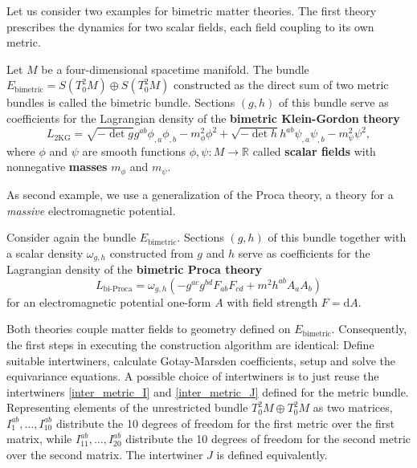 Let us consider two examples for bimetric matter theories. The first theory prescribes the dynamics for two scalar fields, each field coupling to its own metric.
\begin{definition}
  Let $M$ be a four-dimensional spacetime manifold. The bundle $E_\text{bimetric} = S(T^2_0M) \oplus S(T^2_0M)$ constructed as the direct sum of two metric bundles is called the bimetric bundle. Sections $(g,h)$ of this bundle serve as coefficients for the Lagrangian density of the \textbf{bimetric Klein-Gordon theory}
  \begin{equation}
    L_\text{2KG} = \sqrt{-\operatorname{det}g}g^{ab} \phi_{,a}\phi_{,b} - m_\phi^2 \phi^2 + \sqrt{-\operatorname{det}h}h^{ab} \psi_{,a}\psi_{,b} - m_\psi^2 \psi^2,
  \end{equation}
  where $\phi$ and $\psi$ are smooth functions $\phi,\psi\colon M\rightarrow \mathbb R$ called \textbf{scalar fields} with nonnegative \textbf{masses} $m_\phi$ and $m_\psi$.
\end{definition}
As second example, we use a generalization of the Proca theory, a theory for a \emph{massive} electromagnetic potential.
\begin{definition}
  Consider again the bundle $E_\text{bimetric}$. Sections $(g,h)$ of this bundle together with a scalar density $\omega_{g,h}$ constructed from $g$ and $h$ serve as coefficients for the Lagrangian density of the \textbf{bimetric Proca theory}
  \begin{equation}
    L_\text{bi-Proca} = \omega_{g,h}\left( -g^{ac} g^{bd} F_{ab} F_{cd} + m^2 h^{ab} A_a A_b \right)
  \end{equation}
  for an electromagnetic potential one-form $A$ with field strength $F=\mathrm dA$.
\end{definition}

Both theories couple matter fields to geometry defined on $E_\text{bimetric}$. Consequently, the first steps in executing the construction algorithm are identical: Define suitable intertwiners, calculate Gotay-Marsden coefficients, setup and solve the equivariance equations. A possible choice of intertwiners is to just reuse the intertwiners \eqref{inter_metric_I} and \eqref{inter_metric_J} defined for the metric bundle. Representing elements of the unrestricted bundle $T^2_0M\oplus T^2_0M$ as two matrices, $I_1^{ab},\dots,I_{10}^{ab}$ distribute the 10 degrees of freedom for the first metric over the first matrix, while $I_{11}^{ab},\dots,I_{20}^{ab}$ distribute the 10 degrees of freedom for the second metric over the second matrix. The intertwiner $J$ is defined equivalently.

